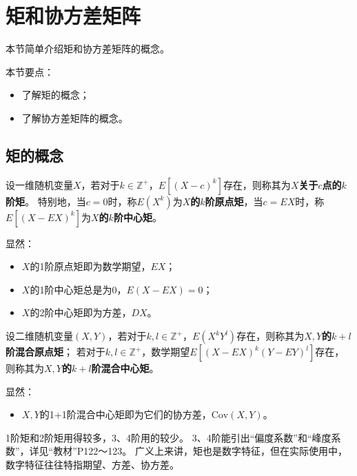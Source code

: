 \section{矩和协方差矩阵}

本节简单介绍矩和协方差矩阵的概念。

本节要点：
\begin{itemize}
    \item 了解矩的概念；
    \item 了解协方差矩阵的概念。
\end{itemize}

\subsection{矩的概念}

\begin{definition}[矩]
设一维随机变量$X$，若对于$k\in \mathbb{Z} ^+$，$E\left[ \left( X-c \right) ^k \right] $存在，则称其为{\bf $X$关于$c$点的$k$阶矩}。
特别地，当$c=0$时，称$E\left( X^k \right) $为{\bf $X$的$k$阶原点矩}，当$c=EX$时，称$E\left[ \left( X-EX \right) ^k \right] $为{\bf $X$的$k$阶中心矩}。
\end{definition}

显然：
\begin{itemize}
    \item $X$的1阶原点矩即为数学期望，$EX$；
    \item $X$的1阶中心矩总是为0，$E\left( X-EX \right) =0$；
    \item $X$的2阶中心矩即为方差，$DX$。
\end{itemize}

\begin{definition}[混合矩]
设二维随机变量$\left( X,Y \right) $，若对于$k,l\in \mathbb{Z} ^+$，$E\left( X^kY^l \right) $存在，则称其为{\bf $X,Y$的$k+l$阶混合原点矩}；
若对于$k,l\in \mathbb{Z} ^+$，数学期望$E\left[ \left( X-EX \right) ^k\left( Y-EY \right) ^l \right] $存在，则称其为{\bf $X,Y$的$k+l$阶混合中心矩}。
\end{definition}

显然：
\begin{itemize}
    \item $X,Y$的1+1阶混合中心矩即为它们的协方差，$\mathrm{Cov}\left( X,Y \right) $。
\end{itemize}

\begin{tcolorbox}
1阶矩和2阶矩用得较多，3、4阶用的较少。
3、4阶能引出“偏度系数”和“峰度系数”，详见“教材\cite{book2}”P122～123。
广义上来讲，矩也是数字特征，但在实际使用中，数字特征往往特指期望、方差、协方差。
\end{tcolorbox}

